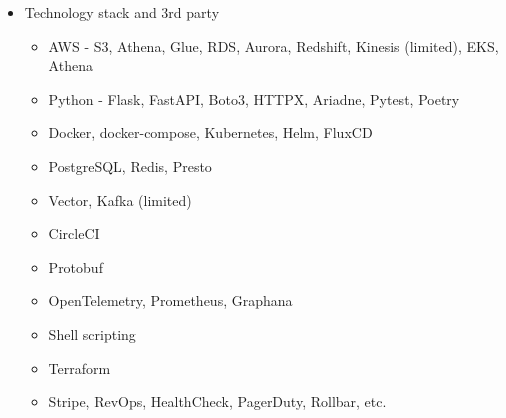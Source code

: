 \documentclass[11pt,a4paper,sans]{moderncv}
\begin{document}
{\begin{itemize}
\begin{itemize}
                \item Conduct company wide technical and product demos on the weekly basis
                \item Organize and conducting communication with stakeholders and other teams
                \item Conduct gate keeping code and documentation review 
                \item Create (documented) architecture design proposals - system/API/data schema design; SLA/SLO outline
                \item Manage full life cycle of the delivery process
                    \begin{itemize}
                        \item set up VCS repositories - create CI/CD configuration, documentation, local dev environment
                        \item add implementation and functional/integration test coverage
                        \item set GitOps automation with resources, quotas and roll-out strategies according to the defined SLA/SLO
                        \item set periodical smoke tests and monitoring/alerting
                        \item implement the user roll-out strategy
                        \item create the customer facing documentation
                        \item set up on-call process for the released products
                        \item participate in the CS L2/L3 escalation rotations
                    \end{itemize}
            \end{itemize}
        \item Technology stack and 3rd party
            \begin{itemize}
                \item AWS - S3, Athena, Glue, RDS, Aurora, Redshift, Kinesis (limited), EKS, Athena
                \item Python - Flask, FastAPI, Boto3, HTTPX, Ariadne, Pytest, Poetry
                \item Docker, docker-compose, Kubernetes, Helm, FluxCD
                \item PostgreSQL, Redis, Presto
                \item Vector, Kafka (limited)
                \item CircleCI
                \item Protobuf
                \item OpenTelemetry, Prometheus, Graphana
                \item Shell scripting
                \item Terraform 
                \item Stripe, RevOps, HealthCheck, PagerDuty, Rollbar, etc.
            \end{itemize}
    \end{itemize}
}
\end{document}
